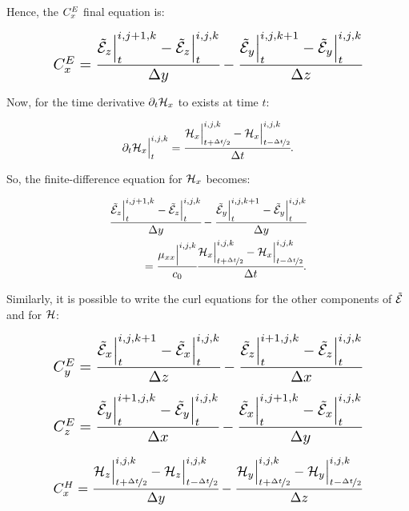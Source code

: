 Hence, the $C_x^E$ final equation is:

\begin{align}
    \resizebox{.8\hsize}{!}{$
        \CEx = \cfrac{\En_z\Big|^{i,j+1,k}_t-\En_z\Big|^{i,j,k}_t}{\dy} - \cfrac{\En_y\Big|^{i,j,k+1}_t-\En_y\Big|^{i,j,k}_t}{\dz}
        \label{eq:CEx}
    $}
\end{align}


Now, for the time derivative $\partial_t \mathcal{H}_x$ to exists at time $t$:

\begin{equation}
    \partial_t \mathcal{H}_x\Big|^{i,j,k}_t = \cfrac{\mathcal{H}_x\Big|^{i,j,k}_{t+\nicefrac{\Delta t}{2}} - \mathcal{H}_x\Big|^{i,j,k}_{t-\nicefrac{\Delta t}{2}}}{\Delta t}.
\end{equation}

So, the finite-difference equation for $\mathcal{H}_x$ becomes:

\begin{align}
    \cfrac{\tilde{\mathcal{E}}_z\Big|^{i,j+1,k}_{t}-\tilde{\mathcal{E}}_z\Big|^{i,j,k}_{t}}{\Delta y} - \cfrac{\tilde{\mathcal{E}}_y\Big|^{i,j,k+1}_{t}-\tilde{\mathcal{E}}_y\Big|^{i,j,k}_{t}}{\Delta y} \nonumber \\ 
    =\cfrac{\mu_{xx}\Big|^{i,j,k}}{c_0}\cfrac{\mathcal{H}_x\Big|^{i,j,k}_{t+\nicefrac{\Delta t}{2}} - \mathcal{H}_x\Big|^{i,j,k}_{t-\nicefrac{\Delta t}{2}}}{\Delta t}.
    \label{eq:fd_hx}
\end{align}

Similarly, it is possible to write the curl equations for the other components of $\tilde{\mathcal{E}}$ and for $\mathcal{H}$:



\begin{align}
    \resizebox{.8\hsize}{!}{$
    \CEy = \cfrac{\En_x\Big|^{i,j,k+1}_{t}-\En_x\Big|^{i,j,k}_{t}}{\dz} - \cfrac{\En_z\Big|^{i+1,j,k}_{t}-\En_z\Big|^{i,j,k}_{t}}{\dx}
    \label{eq:CEy}
    $}
\end{align}

\begin{align}
    \resizebox{.8\hsize}{!}{$
        \CEz = \cfrac{\En_y\Big|^{i+1,j,k}_{t}-\En_y\Big|^{i,j,k}_{t}}{\dx} - \cfrac{\En_x\Big|^{i,j+1,k}_{t}-\En_x\Big|^{i,j,k}_{t}}{\dy}
        \label{eq:CEz}
    $}
\end{align}

\begin{align}
    \resizebox{.8\hsize}{!}{$
        \CHx = \cfrac{\Hht_z\Big|^{i,j,k}_{t+\nicefrac{\dt}{2}}-\Hht_z\Big|^{i,j,k}_{t-\nicefrac{\dt}{2}}}{\dy} - \cfrac{\Hht_y\Big|^{i,j,k}_{t+\nicefrac{\dt}{2}}-\Hht_y\Big|^{i,j,k}_{t-\nicefrac{\dt}{2}}}{\dz}
        \label{eq:CHx}
    $}
\end{align}


